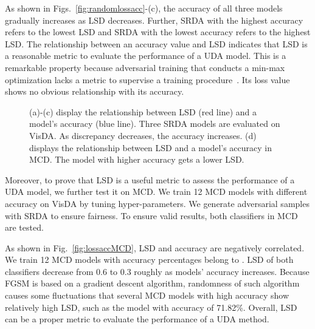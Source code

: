 \documentclass[journal,twocolumn]{IEEEtran}
\theoremstyle{definition}
\begin{document}
As shown in Figs.~\ref{fig:randomlossacc}-(c), the accuracy of all three models gradually increases as LSD decreases. Further, SRDA with the highest accuracy refers to the lowest LSD and SRDA with the lowest accuracy refers to the highest LSD. The relationship between an accuracy value and LSD indicates that LSD is a reasonable metric to evaluate the performance of a UDA model. This is a remarkable property because adversarial training that conducts a min-max optimization lacks a metric to supervise a training procedure~\cite{ganin2016domain}. Its loss value shows no obvious relationship with its accuracy. 
\begin{figure}[h]
  \centering
\caption{(a)-(c) display the relationship between LSD (red line) and a model's accuracy (blue line). Three SRDA models are evaluated on VisDA. As discrepancy decreases, the accuracy increases. (d) displays the relationship between LSD and a model's accuracy in MCD. The model with higher accuracy gets a lower LSD.}
  \label{fig:lossacc} \end{figure} 

Moreover, to prove that LSD is a useful metric to assess the performance of a UDA model, we further test it on MCD. We train 12 MCD models with different accuracy on VisDA by tuning hyper-parameters. We generate adversarial samples with SRDA to ensure fairness. To ensure valid results, both classifiers in MCD are tested.

As shown in Fig.~\ref{fig:lossaccMCD}, LSD and accuracy are negatively correlated. We train 12 MCD models with accuracy percentages belong to   . LSD of both classifiers decrease from 0.6 to 0.3 roughly as models' accuracy increases. Because FGSM is based on a gradient descent algorithm, randomness of such algorithm causes some fluctuations that several MCD models with high accuracy show relatively high LSD, such as the model with accuracy of 71.82\%.  Overall, LSD can be a proper metric to evaluate the performance of a UDA method.
\end{document}
